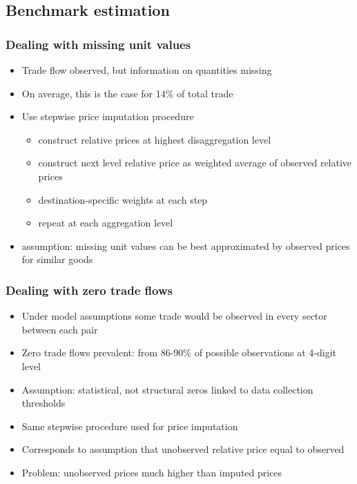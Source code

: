 \documentclass{beamer}
\begin{document}
\subsection{Benchmark estimation}
\begin{frame}\frametitle{Dealing with missing unit values}
\begin{itemize}
\item Trade flow observed, but information on quantities missing
\item On average, this is the case for 14\% of total trade
\vspace{0.3cm}
\item Use stepwise price imputation procedure
\begin{itemize}
\item construct relative prices at highest disaggregation level
\item construct next level relative price as weighted average of observed relative prices
\item destination-specific weights at each step
\item repeat at each aggregation level
\end{itemize}
\vspace{0.3cm}
\item assumption: missing unit values can be best approximated by observed prices for similar goods
\end{itemize}
\end{frame}

\begin{frame}[plain]\frametitle{Dealing with zero trade flows}
\begin{itemize}
\item Under model assumptions some trade would be observed in every sector between each pair
\item Zero trade flows prevalent: from 86-90\% of possible observations at 4-digit level
\item Assumption: statistical, not structural zeros linked to data collection thresholds
\item Same stepwise procedure used for price imputation
\item Corresponds to assumption that unobserved relative price equal to observed
\item Problem: unobserved prices much higher than imputed prices
\end{itemize}
\end{frame}
\end{document}
